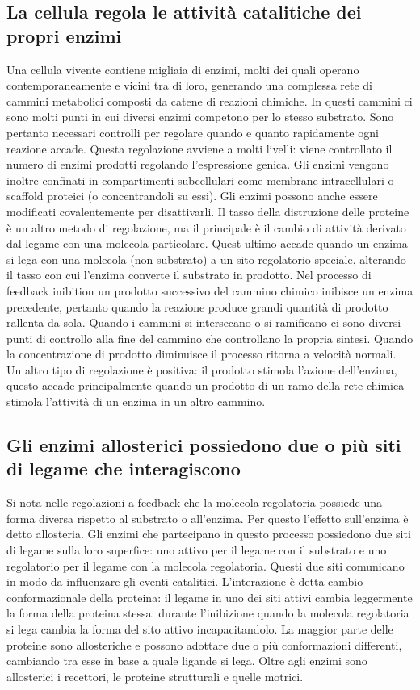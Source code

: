 \subsection{La cellula regola le attivit\`a catalitiche dei propri enzimi}
Una cellula vivente contiene migliaia di enzimi, molti dei quali operano contemporaneamente e vicini tra di loro, generando una complessa rete di cammini metabolici composti da catene
di reazioni chimiche. In questi cammini ci sono molti punti in cui diversi enzimi competono per lo stesso substrato. Sono pertanto necessari controlli per regolare quando e quanto 
rapidamente ogni reazione accade. Questa regolazione avviene a molti livelli: viene controllato il numero di enzimi prodotti regolando l'espressione genica. Gli enzimi vengono inoltre
confinati in compartimenti subcellulari come membrane intracellulari o scaffold proteici (o concentrandoli su essi). Gli enzimi possono anche essere modificati covalentemente per 
disattivarli. Il tasso della distruzione delle proteine \`e un altro metodo di regolazione, ma il principale \`e il cambio di attivit\`a derivato dal legame con una molecola particolare.
Quest ultimo accade quando un enzima si lega con una molecola (non substrato) a un sito regolatorio speciale, alterando il tasso con cui l'enzima converte il substrato in prodotto. Nel
processo di feedback inibition un prodotto successivo del cammino chimico inibisce un enzima precedente, pertanto quando la reazione produce grandi quantit\`a di prodotto rallenta da 
sola. Quando i cammini si intersecano o si ramificano ci sono diversi punti di controllo alla fine del cammino che controllano la propria sintesi. Quando la concentrazione di prodotto
diminuisce il processo ritorna a velocit\`a normali. Un altro tipo di regolazione \`e positiva: il prodotto stimola l'azione dell'enzima, questo accade principalmente quando un prodotto
di un ramo della rete chimica stimola l'attivit\`a di un enzima in un altro cammino. 
\subsection{Gli enzimi allosterici possiedono due o pi\`u siti di legame che interagiscono}
Si nota nelle regolazioni a feedback che la molecola regolatoria possiede una forma diversa rispetto al substrato o all'enzima. Per questo l'effetto sull'enzima \`e detto allosteria. 
Gli enzimi che partecipano in questo processo possiedono due siti di legame sulla loro superfice: uno attivo per il legame con il substrato e uno regolatorio per il legame con la
molecola regolatoria. Questi due siti comunicano in modo da influenzare gli eventi catalitici. L'interazione \`e detta cambio conformazionale della proteina: il legame in uno dei siti
attivi cambia leggermente la forma della proteina stessa: durante l'inibizione quando la molecola regolatoria si lega cambia la forma del sito attivo incapacitandolo. La maggior parte
delle proteine sono allosteriche e possono adottare due o pi\`u conformazioni differenti, cambiando tra esse in base a quale ligande si lega. Oltre agli enzimi sono allosterici i 
recettori, le proteine strutturali e quelle motrici. 
